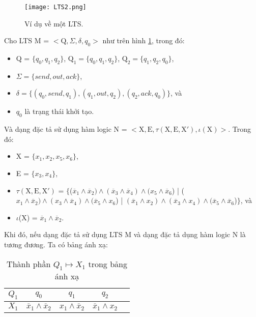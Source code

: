 \documentclass[a4paper,13pt,oneside,openany]{book}
\begin{document}
\begin{flushleft}
		\begin{figure}[h]
			\centering
			\texttt{[image: LTS2.png]}
			\caption{Ví dụ về một LTS.}
			\label{fig:LTS3}
		\end{figure}
		Cho LTS M = $<\textrm{Q}, \Sigma, \delta, q_{0}>$ như trên hình \ref{fig:LTS3}, trong đó:
		\begin{itemize}
			\item Q = $\{q_0, q_1, q_2\}$, $\textrm{Q}_1 = \{q_0, q_1, q_2\}$, $\textrm{Q}_2 = \{q_1, q_2, q_0\}$,
			\item $\Sigma = \{send, out, ack\}$,
			\item $\delta = \{(q_0, send, q_1), (q_1, out, q_2), (q_2, ack, q_0)\}$, và
			\item $q_0$ là trạng thái khởi tạo.
		\end{itemize}
		Và dạng đặc tả sử dụng hàm logic N = $<\textrm{X}, \textrm{E}, \tau(\textrm{X}, \textrm{E}, \textrm{X}'), \iota(\textrm{X})>$. Trong đó:\\
		\begin{itemize}
			\item X = $\{x_1, x_2, x_5, x_6\}$,
			\item E = $\{x_3, x_4\}$,
			\item $\tau(\textrm{X}, \textrm{E}, \textrm{X}')$ = $\{$($\overline{x}_1 \land \overline{x}_2) \land (\overline{x}_3 \land \overline{x}_4) \land (x_5 \land \overline{x}_6$) | ($x_1\land\overline{x}_2)\land (x_3\land \overline{x}_4)\land (\overline{x}_5 \land x_6$) | $(\overline{x}_1\land x_2)\land(\overline{x}_3\land x_4)\land (\overline{x}_5\land\overline{x}_6$)$\}$, và
			\item $\iota$(X) = $\overline{x}_1 \land \overline{x}_2$.
		\end{itemize}
		Khi đó, nếu dạng đặc tả sử dụng LTS M và dạng đặc tả dụng hàm logic N là tương đương. Ta có bảng ánh xạ:
		\begin{table}[!ht]
			\centering
			\renewcommand{\arraystretch}{1.25}
			\begin{tabular}{|c|c|c|c|c|}
				\hline
				$Q_1$ & $q_0$ & $q_1$ & $q_2$\\
				\hline
				$X_1$ & $\overline{x}_1 \land \overline{x}_2$ & $x_1\land\overline{x}_2$&$\overline{x}_1\land x_2$\\
				\hline
			\end{tabular}
			\caption{Thành phần $Q_1 \mapsto X_1$ trong bảng ánh xạ}
		\end{table}
		\begin{table}[!ht]
			\centering

\end{table}
\end{flushleft}
\end{document}
